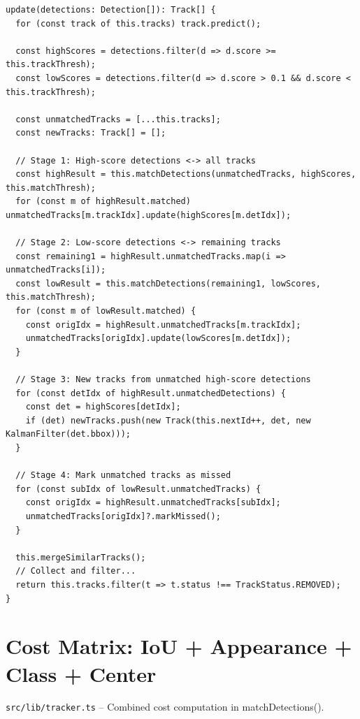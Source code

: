 \begin{lstlisting}[style=typescript, caption={ByteTracker.update()}, label={lst:bytetrack-update}]
update(detections: Detection[]): Track[] {
  for (const track of this.tracks) track.predict();

  const highScores = detections.filter(d => d.score >= this.trackThresh);
  const lowScores = detections.filter(d => d.score > 0.1 && d.score < this.trackThresh);

  const unmatchedTracks = [...this.tracks];
  const newTracks: Track[] = [];

  // Stage 1: High-score detections <-> all tracks
  const highResult = this.matchDetections(unmatchedTracks, highScores, this.matchThresh);
  for (const m of highResult.matched) unmatchedTracks[m.trackIdx].update(highScores[m.detIdx]);

  // Stage 2: Low-score detections <-> remaining tracks
  const remaining1 = highResult.unmatchedTracks.map(i => unmatchedTracks[i]);
  const lowResult = this.matchDetections(remaining1, lowScores, this.matchThresh);
  for (const m of lowResult.matched) {
    const origIdx = highResult.unmatchedTracks[m.trackIdx];
    unmatchedTracks[origIdx].update(lowScores[m.detIdx]);
  }

  // Stage 3: New tracks from unmatched high-score detections
  for (const detIdx of highResult.unmatchedDetections) {
    const det = highScores[detIdx];
    if (det) newTracks.push(new Track(this.nextId++, det, new KalmanFilter(det.bbox)));
  }

  // Stage 4: Mark unmatched tracks as missed
  for (const subIdx of lowResult.unmatchedTracks) {
    const origIdx = highResult.unmatchedTracks[subIdx];
    unmatchedTracks[origIdx]?.markMissed();
  }

  this.mergeSimilarTracks();
  // Collect and filter...
  return this.tracks.filter(t => t.status !== TrackStatus.REMOVED);
}
\end{lstlisting}

\section{Cost Matrix: IoU + Appearance + Class + Center}
\label{sec:code-cost}
\texttt{src/lib/tracker.ts} -- Combined cost computation in matchDetections().

